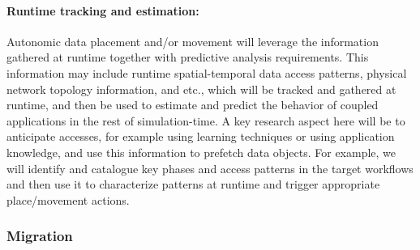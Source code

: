 \paragraph{ Runtime tracking and estimation:}
Autonomic data placement and/or
movement will leverage the information gathered at runtime together with
predictive analysis requirements. This information may include runtime
spatial-temporal data access patterns, physical network topology
information, and etc., which will be tracked and gathered at runtime, and
then be used to estimate and predict the behavior of coupled applications in
the rest of simulation-time. A key research aspect here will be to
anticipate accesses, for example using learning techniques or using
application knowledge, and use this information to prefetch data objects.
For example, we will identify and catalogue key phases and access patterns
in the target workflows and then use it to characterize patterns at runtime
and trigger appropriate place/movement actions.

\subsubsection{Migration}
\label{sec:migration}


